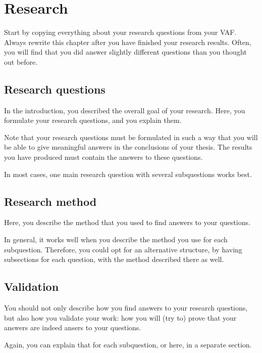 \chapter{Research}
Start by copying everything about your research questions from your VAF. Always rewrite this chapter after you have finished your research results. Often, you will find that you did answer slightly different questions than you thought out before.

\section{Research questions}
In the introduction, you described the overall goal of your research.
Here, you formulate your research questions, and you explain them.

Note that your research questions must be formulated in such a way that you will be able to give meaningful answers in the conclusions of your thesis. The results you have produced must contain the answers to these questions.

In most cases, one main research question with several subquestions works best.

\section{Research method}
Here, you describe the method that you used to find answers to your questions. 

In general, it works well when you describe the method you use for each subquestion.  Therefore, you could opt for an alternative structure, by having subsections for each question, with the method described there as well.

\section{Validation}
You should not only describe how you find answers to your research questions, but also how you validate your work: how you will (try to) prove that your answers are indeed ansers to your questions.

Again, you can explain that for each subquestion, or here, in a separate section.
